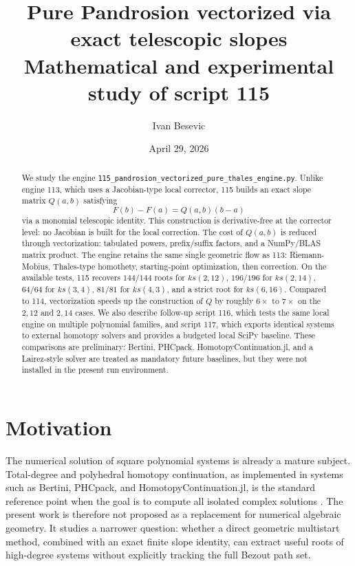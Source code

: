 \documentclass[11pt,a4paper]{article}
\title{Pure Pandrosion vectorized via exact telescopic slopes\\\large Mathematical and experimental study of script 115}
\author{Ivan Besevic}
\date{April 29, 2026}
\begin{document}
\maketitle

\begin{abstract}
We study the engine \texttt{115\_pandrosion\_vectorized\_pure\_thales\_engine.py}. Unlike engine 113, which uses a Jacobian-type local corrector, 115 builds an exact slope matrix \(Q(a,b)\) satisfying
\[
  F(b)-F(a)=Q(a,b)(b-a)
\]
via a monomial telescopic identity. This construction is derivative-free at the corrector level: no Jacobian is built for the local correction. The cost of \(Q(a,b)\) is reduced through vectorization: tabulated powers, prefix/suffix factors, and a NumPy/BLAS matrix product. The engine retains the same single geometric flow as 113: Riemann-Mobius, Thales-type homothety, starting-point optimization, then correction. On the available tests, 115 recovers \(144/144\) roots for \(ks(2,12)\), \(196/196\) for \(ks(2,14)\), \(64/64\) for \(ks(3,4)\), \(81/81\) for \(ks(4,3)\), and a strict root for \(ks(6,16)\). Compared to 114, vectorization speeds up the construction of \(Q\) by roughly \(6\times\) to \(7\times\) on the \(2,12\) and \(2,14\) cases.
We also describe follow-up script 116, which tests the same local engine on multiple polynomial families, and script 117, which exports identical systems to external homotopy solvers and provides a budgeted local SciPy baseline. These comparisons are preliminary: Bertini, PHCpack, HomotopyContinuation.jl, and a Lairez-style solver are treated as mandatory future baselines, but they were not installed in the present run environment.
\end{abstract}

\section{Motivation}
The numerical solution of square polynomial systems is already a mature subject. Total-degree and polyhedral homotopy continuation, as implemented in systems such as Bertini, PHCpack, and HomotopyContinuation.jl, is the standard reference point when the goal is to compute all isolated complex solutions \cite{bates2013bertini,verschelde1999phcpack,breiding2018hc}. The present work is therefore not proposed as a replacement for numerical algebraic geometry. It studies a narrower question: whether a direct geometric multistart method, combined with an exact finite slope identity, can extract useful roots of high-degree systems without explicitly tracking the full Bezout path set.
\end{document}
